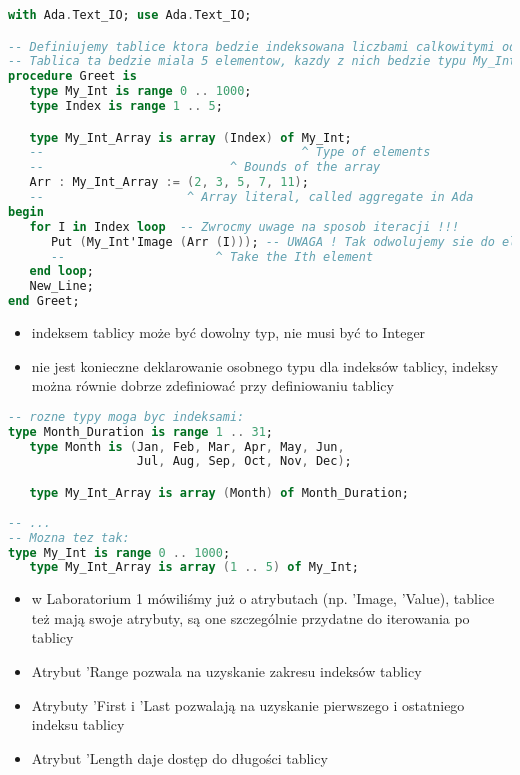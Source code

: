 \documentclass[a4paper,15pt]{article}
\begin{document}
\begin{lstlisting}[language=Ada, caption=Definiowanie tablicy z jawnie określonymi indeksami]
with Ada.Text_IO; use Ada.Text_IO;

-- Definiujemy tablice ktora bedzie indeksowana liczbami calkowitymi od 1 do 5
-- Tablica ta bedzie miala 5 elementow, kazdy z nich bedzie typu My_Int
procedure Greet is
   type My_Int is range 0 .. 1000;
   type Index is range 1 .. 5;

   type My_Int_Array is array (Index) of My_Int;
   --                                    ^ Type of elements
   --                          ^ Bounds of the array
   Arr : My_Int_Array := (2, 3, 5, 7, 11);
   --                    ^ Array literal, called aggregate in Ada
begin
   for I in Index loop	-- Zwrocmy uwage na sposob iteracji !!!
      Put (My_Int'Image (Arr (I))); -- UWAGA ! Tak odwolujemy sie do elementow tablicy!
      --                     ^ Take the Ith element
   end loop;
   New_Line;
end Greet;
\end{lstlisting}

\begin{itemize}
\item indeksem tablicy może być dowolny typ, nie musi być to Integer
\item nie jest konieczne deklarowanie osobnego typu dla indeksów tablicy, indeksy można równie dobrze zdefiniować przy definiowaniu tablicy
\end{itemize}

\begin{lstlisting}[language=Ada, caption=Rozne typy jako indeksy tablicy]
-- rozne typy moga byc indeksami:
type Month_Duration is range 1 .. 31;
   type Month is (Jan, Feb, Mar, Apr, May, Jun,
                  Jul, Aug, Sep, Oct, Nov, Dec);

   type My_Int_Array is array (Month) of Month_Duration;
   
-- ...
-- Mozna tez tak:
type My_Int is range 0 .. 1000;
   type My_Int_Array is array (1 .. 5) of My_Int;
\end{lstlisting}


\begin{itemize}
\item w Laboratorium 1 mówiliśmy już o atrybutach (np. 'Image, 'Value), tablice też mają swoje atrybuty, są one szczególnie przydatne do iterowania po tablicy
\item Atrybut 'Range pozwala na uzyskanie zakresu indeksów tablicy
\item Atrybuty 'First i 'Last pozwalają na uzyskanie pierwszego i ostatniego indeksu tablicy
\item Atrybut 'Length daje dostęp do długości tablicy
\end{itemize}
\end{document}
